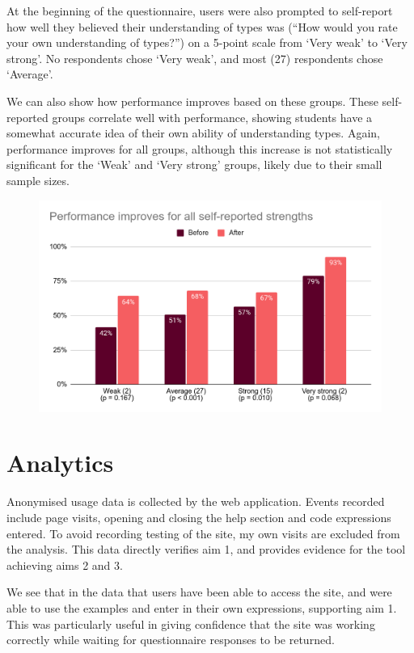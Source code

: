 \documentclass[a4paper,fleqn,oneside,12pt]{report}
\begin{document}
At the beginning of the questionnaire, users were also prompted to self-report how well they believed their understanding of types was (“How would you rate your own understanding of types?”) on a 5-point scale from ‘Very weak’ to ‘Very strong’. No respondents chose ‘Very weak’, and most (27) respondents chose ‘Average’.

We can also show how performance improves based on these groups. These self-reported groups correlate well with performance, showing students have a somewhat accurate idea of their own ability of understanding types. Again, performance improves for all groups, although this increase is not statistically significant for the ‘Weak’ and ‘Very strong’ groups, likely due to their small sample sizes.

{\centering \begin{figure}[h!]
  \centering
  \includegraphics[width=0.884\linewidth]{images/image27.png}
  \label{figure:Chart}
\end{figure} \par}
\section{Analytics}\label{id:h.67g05flyfv0z}
Anonymised usage data is collected by the web application. Events recorded include page visits, opening and closing the help section and code expressions entered. To avoid recording testing of the site, my own visits are excluded from the analysis. This data directly verifies aim 1, and provides evidence for the tool achieving aims 2 and 3.

We see that in the data that users have been able to access the site, and were able to use the examples and enter in their own expressions, supporting aim 1. This was particularly useful in giving confidence that the site was working correctly while waiting for questionnaire responses to be returned.
\end{document}
